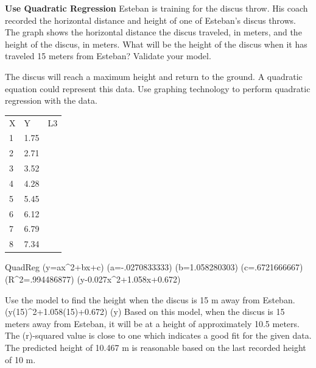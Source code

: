\documentclass{article}
\newenvironment{example}[1]{}{}         %
\newcommand{\answer}[1]{}               %
\newcommand{\placeholder}[2]{}          %
\newcommand{\te}[1]{}                   %
\begin{document}
\begin{example}{5}
\textbf{Use Quadratic Regression}
Esteban is training for the discus throw. His coach recorded the horizontal distance and height of one of Esteban's discus throws. The graph shows the horizontal distance the discus traveled, in meters, and the height of the discus, in meters. What will be the height of the discus when it has traveled 15 meters from Esteban? Validate your model.
\placeholder{graph}{Discus throw scatterplot over stadium illustration: thrower at lower left, red discus points labeled (1,1.75),(2,2.71),(3,3.52),(4,4.28),(5,5.45),(6,6.12),(7,6.79),(8,7.34),(9,7.99),(10,8.55). Black axes with arrows, horizontal Distance (meters) labels 0 through 11 by 1, vertical Height (meters) labels 0 through 9 by 1. No plotted fitted curve.}
The discus will reach a maximum height and return to the ground. A quadratic equation could represent this data.
Use graphing technology to perform quadratic regression with the data.
\begin{tabular}{lll}
X & Y & L3 \\
1 & 1.75 & \\
2 & 2.71 & \\
3 & 3.52 & \\
4 & 4.28 & \\
5 & 5.45 & \\
6 & 6.12 & \\
7 & 6.79 & \\
8 & 7.34 & \\
\end{tabular}
QuadReg
(y=ax^2+bx+c)
(a=-.0270833333)
(b=1.058280303)
(c=.6721666667)
(R^2=.994486877)
(y\approx -0.027x^2+1.058x+0.672)
\te{Callout: Here is our model.}
Use the model to find the height when the discus is 15 m away from Esteban.
(y(15)^2+1.058(15)+0.672)
(y)
Based on this model, when the discus is 15 meters away from Esteban, it will be at a height of approximately 10.5 meters.
The (r)-squared value is close to one which indicates a good fit for the given data. The predicted height of 10.467 m is reasonable based on the last recorded height of 10 m.
\te{Printed last recorded height of 10 m; the last plotted point is (10,8.55), so 10 is the horizontal distance.}
\te{COMMON ERROR Remember that once you use a regression equation, you are approximating values. Regression is used to make predictions, not to find exact values of variables.}
\te{Callout: To validate a mathematical model is to determine its reasonableness and its accuracy for the model's purpose.}
\answer{Approximately 10.5 meters; (y\approx 10.467\text{ m}).}
\end{example}
\end{document}
